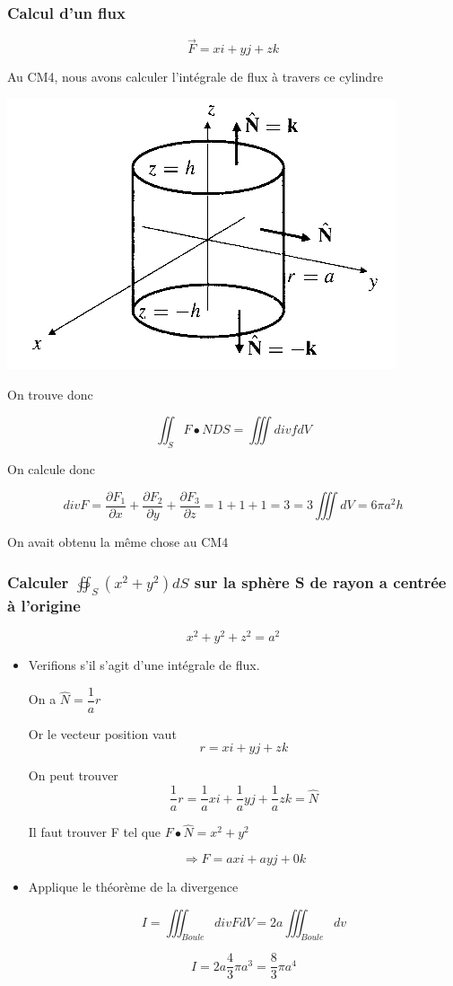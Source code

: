 \subsubsection{Calcul d'un flux}
\[\vec F = x i + y j + z k \]

Au CM4, nous avons calculer l'intégrale de flux à travers ce cylindre

\includegraphics[scale=0.7]{image6.png}

On trouve donc

\[\iint_S F \bullet N DS = \iiint div f dV\]

On calcule donc

\[div F = \frac{\partial F_1}{\partial x}+ \frac{\partial F_2}{\partial y} + \frac{\partial F_3}{\partial z}= 1+1+1=3 = 3 \iiint dV = 6 \pi a^2 h\]

On avait obtenu la même chose au CM4

\subsubsection{Calculer $\oiint_S(x^2+y^2)dS$ sur la sphère S de rayon a centrée à l'origine}

\[x^2+y^2+z^2 = a^2\]

\begin{itemize}

\item Verifions s'il s'agit d'une intégrale de flux.

On a $\hat N = \dfrac{1}{a} r $

Or le vecteur position vaut
\[r = xi +yj +zk\]

On peut trouver
\[\dfrac{1}{a}r = \dfrac{1}{a}xi +\dfrac{1}{a}yj +\dfrac{1}{a}zk = \hat N\]

Il faut trouver F tel que $F\bullet \hat N = x^2 + y ^2 $

\[\Rightarrow F = axi +ayj +0k \]
\item Applique le théorème de la divergence

$$ I = \iiint_{Boule} div F dV = 2a \iiint_{Boule}dv$$

\[I = 2a \dfrac{4}{3}\pi a^3 = \dfrac{8}{3}\pi a^4\]
\end{itemize}

